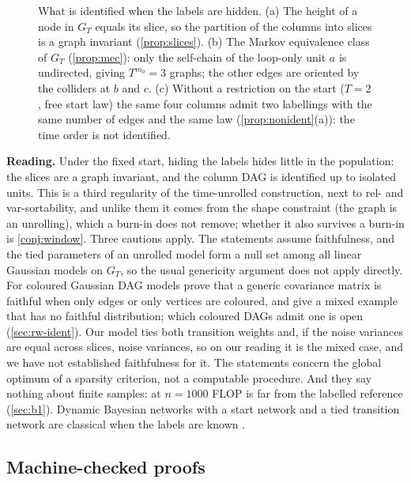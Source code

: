 \documentclass[pdflatex,sn-apa]{sn-jnl}
\newcommand{\tikzfig}[1]{\adjustbox{max width=\textwidth,center}{}}
\theoremstyle{thmstyleone}
\theoremstyle{thmstylethree}
\theoremstyle{thmstyletwo}
\newcommand{\GT}{G_T}
\begin{document}
\begin{figure}[t]
\centering
\tikzfig{fig_ident}
\caption{What is identified when the labels are hidden. (a) The height of a node in $G_T$ equals its slice, so the partition of the columns into slices is a graph invariant
(\cref{prop:slices}). (b) The Markov equivalence class of $G_T$ (\cref{prop:mec}): only the self-chain of the loop-only unit $a$ is
undirected, giving $T^{m_0}=3$ graphs; the other edges are oriented by the colliders at $b$ and $c$. (c) Without a restriction on the start
($T=2$, free start law) the same four columns admit two labellings with the same number of edges and the same law (\cref{prop:nonident}(a)): the time order is
not identified.}
\label{fig:ident}
\end{figure}

\textbf{Reading.} Under the fixed start, hiding the labels hides little in
the population: the slices are a graph invariant, and the column DAG is
identified up to isolated units. This is a third regularity of the
time-unrolled construction, next to rel- and var-sortability, and unlike them
it comes from the shape constraint (the graph is an unrolling), which a burn-in
does not remove; whether it also survives a burn-in is \cref{conj:window}.
Three cautions apply. The statements assume faithfulness, and the tied
parameters of an unrolled model form a null set among all linear Gaussian
models on $\GT$, so the usual genericity argument does not apply directly.
For coloured Gaussian DAG models \citet{boege2025colored} prove that a generic
covariance matrix is faithful when only edges or only vertices are coloured,
and give a mixed example that has no faithful distribution; which coloured DAGs
admit one is open (\cref{sec:rw-ident}). Our model ties both transition weights
and, if the noise variances are equal across slices, noise variances, so on our
reading it is the mixed case, and we have not established faithfulness for it.
The statements concern the global optimum of a sparsity criterion, not a
computable procedure. And they say nothing about finite
samples: at $n=1000$ FLOP is far from the labelled reference
(\cref{sec:b1}). Dynamic Bayesian networks with a start network and a tied
transition network are classical when the labels are known
\citep{friedman1998learning}.

\subsection{Machine-checked proofs}
\label{sec:lean}
\end{document}
